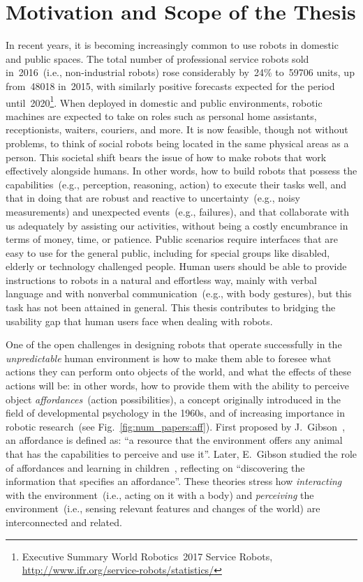 
\chapter{Motivation and Scope of the Thesis}
\label{chap:motivation}

In recent years, it is becoming increasingly common to use robots in domestic and public spaces. The total number of professional service robots sold in~2016~(i.e., non-industrial robots) rose considerably by~24\% to~\num{59706} units, up from~\num{48018} in~2015, with similarly positive forecasts expected for the period until~2020\footnote{Executive Summary World Robotics~2017 Service Robots, \url{http://www.ifr.org/service-robots/statistics/}}.
When deployed in domestic and public environments, robotic machines are expected to take on roles such as personal home assistants, receptionists, waiters, couriers, and more.
It is now feasible, though not without problems, to think of social robots being located in the same physical areas as a person.
This societal shift bears the issue of how to make robots that work effectively alongside humans.
In other words, how to build robots that possess the capabilities~(e.g., perception, reasoning, action) to execute their tasks well, and that in doing that are robust and reactive to uncertainty~(e.g., noisy measurements) and unexpected events~(e.g., failures), and that collaborate with us adequately by assisting our activities, without being a costly encumbrance in terms of money, time, or patience.
Public scenarios require interfaces that are easy to use for the general public, including for special groups like disabled, elderly or technology challenged people.
Human users should be able to provide instructions to robots in a natural and effortless way, mainly with verbal language and with nonverbal communication~(e.g., with body gestures), but this task has not been attained in general.
This thesis contributes to bridging the usability gap that human users face when dealing with robots.

One of the open challenges in designing robots that operate successfully in the \emph{unpredictable} human environment is how to make them able to foresee what actions they can perform onto objects of the world, and what the effects of these actions will be: in other words, how to provide them with the ability to perceive object \emph{affordances}~(action possibilities), a concept originally introduced in the field of developmental psychology in the 1960s, and of increasing importance in robotic research~(see Fig.~\ref{fig:num_papers:aff}). \label{aff_definition}
First proposed by J.~Gibson~\cite{jgibson:2014}, an affordance is defined as: ``a resource that the environment offers any animal that has the capabilities to perceive and use it''.
Later, E.~Gibson studied the role of affordances and learning in children~\cite{egibson:2003:ep}, reflecting on ``discovering the information that specifies an affordance''.
These theories stress how \emph{interacting} with the environment~(i.e., acting on it with a body) and \emph{perceiving} the environment~(i.e., sensing relevant features and changes of the world) are interconnected and related.

